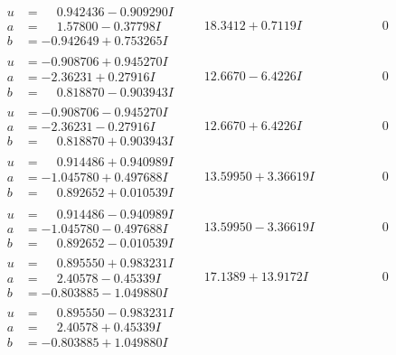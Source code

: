 \documentclass[1p]{elsarticle_modified}
\theoremstyle{definition}
\begin{document}
$$\begin{array}{c|c|c}
\begin{aligned}
u &= \phantom{-}0.942436 - 0.909290 I \\
a &= \phantom{-}1.57800 - 0.37798 I \\
b &= -0.942649 + 0.753265 I\end{aligned}
 & \phantom{-}18.3412 + 0.7119 I & \phantom{-0.000000 } 0 \\ \hline\begin{aligned}
u &= -0.908706 + 0.945270 I \\
a &= -2.36231 + 0.27916 I \\
b &= \phantom{-}0.818870 - 0.903943 I\end{aligned}
 & \phantom{-}12.6670 - 6.4226 I & \phantom{-0.000000 } 0 \\ \hline\begin{aligned}
u &= -0.908706 - 0.945270 I \\
a &= -2.36231 - 0.27916 I \\
b &= \phantom{-}0.818870 + 0.903943 I\end{aligned}
 & \phantom{-}12.6670 + 6.4226 I & \phantom{-0.000000 } 0 \\ \hline\begin{aligned}
u &= \phantom{-}0.914486 + 0.940989 I \\
a &= -1.045780 + 0.497688 I \\
b &= \phantom{-}0.892652 + 0.010539 I\end{aligned}
 & \phantom{-}13.59950 + 3.36619 I & \phantom{-0.000000 } 0 \\ \hline\begin{aligned}
u &= \phantom{-}0.914486 - 0.940989 I \\
a &= -1.045780 - 0.497688 I \\
b &= \phantom{-}0.892652 - 0.010539 I\end{aligned}
 & \phantom{-}13.59950 - 3.36619 I & \phantom{-0.000000 } 0 \\ \hline\begin{aligned}
u &= \phantom{-}0.895550 + 0.983231 I \\
a &= \phantom{-}2.40578 - 0.45339 I \\
b &= -0.803885 - 1.049880 I\end{aligned}
 & \phantom{-}17.1389 + 13.9172 I & \phantom{-0.000000 } 0 \\ \hline\begin{aligned}
u &= \phantom{-}0.895550 - 0.983231 I \\
a &= \phantom{-}2.40578 + 0.45339 I \\
b &= -0.803885 + 1.049880 I\end{aligned}

\end{array}$$
\end{document}

